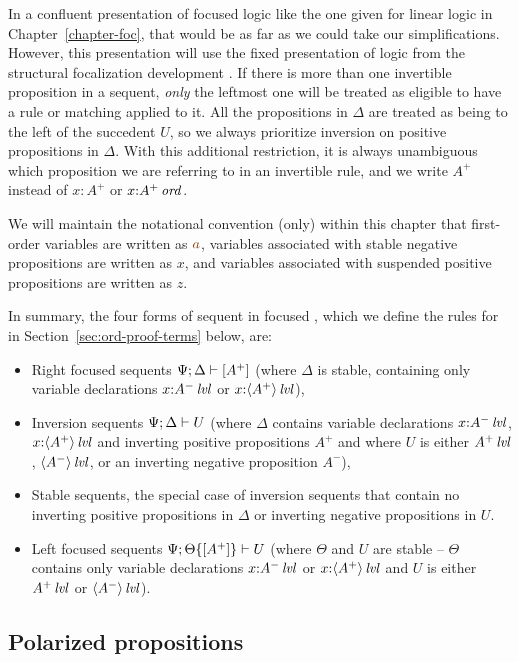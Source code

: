 In a confluent presentation of focused logic like the one given for
linear logic in Chapter~\ref{chapter-foc}, 
that would be as far as we could take our
simplifications. However, this presentation will use the fixed
presentation of logic from the structural focalization development
\cite{simmons11structural}. If there is more than one
invertible proposition in a sequent, {\it only} the leftmost one will
be treated as eligible to have a rule or matching applied to it. All the
propositions in $\Delta$ are treated as being to the left of the
succedent $U$, so we always prioritize inversion on positive
propositions in $\Delta$. With this additional restriction, it is
always unambiguous which proposition we are referring to in an
invertible rule, and we write $A^+$ instead of $x{:}A^+$ or
$x{:}{A^+}\,{{\it ord}}$.

We will maintain the notational convention (only) within this chapter that
first-order variables are written as $\lf{a}$, variables associated
with stable negative propositions are written as $x$, and variables
associated with suspended positive propositions are written as 
$z$. 

In summary,  the four forms of sequent in focused \ollll, which we define
the rules for in Section~\ref{sec:ord-proof-terms} below, are:
\smallskip
\begin{itemize}
\item Right focused sequents ${\Psi};{\Delta} \vdash {[A^+]} \mathstrut$ (where
  $\Delta$ is stable, containing only variable declarations
  $x{:}{A^-}\,{{\it lvl}}$ or $x{:}{\langle {A^+} \rangle}\,{{\it lvl}}$),
\item Inversion sequents ${\Psi};{\Delta} \vdash {U} \mathstrut$ (where $\Delta$ contains
  variable declarations $x{:}{A^-}\,{{\it lvl}}$, $x{:}{\langle {A^+} \rangle}\,{{\it lvl}}$ and
  inverting positive propositions $A^+$ and where $U$ is either 
  ${A^+}\,{{\it lvl}}$, ${\langle {A^-} \rangle}\,{{\it lvl}}$, or an inverting negative
  proposition $A^-$), 
\item Stable sequents, the special case of inversion sequents that
  contain no inverting positive propositions in $\Delta$ or inverting
  negative propositions in $U$.
\item Left focused sequents ${\Psi};{{\Theta}\{{[A^+]}\}} \vdash {U} \mathstrut$
  (where $\Theta$ and $U$ are stable -- $\Theta$ contains only
  variable declarations $x{:}{A^-}\,{{\it lvl}}$ or $x{:}{\langle {A^+} \rangle}\,{{\it lvl}}$ and
  $U$ is either ${A^+}\,{{\it lvl}}$ or ${\langle {A^-} \rangle}\,{{\it lvl}}$).
\end{itemize}


\subsection{Polarized propositions}
\label{sec:ordpolarprop}

